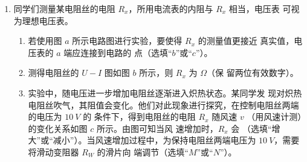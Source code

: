 \begin{enumerate}
\item 
{}
同学们测量某电阻丝的电阻 $ R_{x} $，所用电流表的内阻与 $ R_{x} $ 相当，电压表
可视为理想电压表。
\begin{figure}[h!]
\centering
\begin{subfigure}{0.4\linewidth}
\centering
 
\caption{}\label{}
\end{subfigure}
\begin{subfigure}{0.4\linewidth}
\centering
 
\caption{}\label{}
\end{subfigure}
\begin{subfigure}{0.4\linewidth}
\centering
 
\caption{}\label{}
\end{subfigure}
\begin{subfigure}{0.4\linewidth}
\centering
 
\caption{}\label{}
\end{subfigure}
\end{figure}


\begin{enumerate}
\item
若使用图 $ a $ 所示电路图进行实验，要使得 $ R_{x} $ 的测量值更接近
真实值，电压表的 $ a $ 端应连接到电路的
\underlinegap 
点（选填“$ b $”或“$ c $”）。



\item 
测得电阻丝的 $ U-I $ 图如图 $ b $ 所示，则 $ R_{x} $ 为
\underlinegap 
$ \Omega $（保
留两位有效数字）。



\item 
实验中，随电压进一步增加电阻丝逐渐进入炽热状态。某同学发
现对炽热电阻丝吹气，其阻值会变化。他们对此现象进行探究，在控制电阻丝两端的电压为 $ 10 \ V $ 的
条件下，得到电阻丝的电阻 $ R_{x} $ 随风速 $ v $ （用风速计测）的变化关系如图 $ c $ 所示。由图可知当风
速增加时，$ R_{x} $ 会
\underlinegap 
（选填“增大”或“减小”）。当风速增加过程中，为保持电阻丝两端电压为
$ 10 \ V $，需要将滑动变阻器 $ R_W $ 的滑片向
\underlinegap 
端调节（选填“$ M $”或“$ N $”）。


\end{enumerate}
\end{enumerate}
